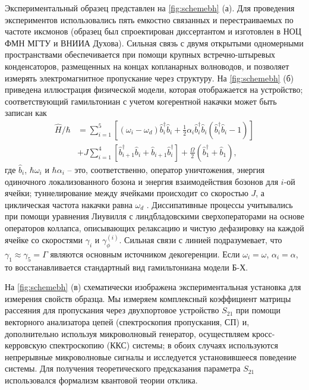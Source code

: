 \documentclass[14pt, a4paper]{extarticle}
\begin{document}
Экспериментальный образец представлен на \autoref{fig:schemebh} (а). Для проведения экспериментов использовались пять емкостно связанных и перестраиваемых по частоте иксмонов (образец был спроектирован диссертантом и изготовлен в НОЦ ФМН МГТУ и ВНИИА Духова). Сильная связь с двумя открытыми одномерными пространствами обеспечивается при помощи крупных встречно-штыревых конденсаторов, размещенных на концах копланарных волноводов, и позволяет измерять электромагнитное пропускание через структуру. На \autoref{fig:schemebh} (б) приведена иллюстрация физической модели, которая отображается на устройство; соответствующий гамильтониан с учетом когерентной накачки может быть записан как
\begin{equation}
\begin{aligned}
\hat H/\hbar &= \sum_{i=1}^5\left[ (\omega_i - \omega_d) \hat b^\dag_i \hat b_i + \frac{1}{2} \alpha_i \hat b_i^\dag \hat b_i (\hat b^\dag_i \hat b_i - 1)\right]\\
&+J\sum_{i=1}^4 \left[\hat b^\dag_{i+1} \hat b_i + \hat b_{i+1} \hat b_i^\dag\right]+\frac{\Omega}{2}(\hat b_1^\dag + \hat b_1),
\end{aligned}\label{eq:bose-hubbard}
\end{equation} 
где $\hat b_i$, $\hbar \omega_i$ и $\hbar \alpha_i$ -- это, соответственно, оператор уничтожения, энергия одиночного локализованного бозона и энергия взаимодействия бозонов  для $i$-ой ячейки; туннелирование между ячейками происходит со скоростью $J$, а циклическая частота накачки равна $\omega_d$ . Диссипативные процессы учитывались при помощи уравнения Лиувилля с линдбладовскими сверхоператорами на основе операторов коллапса, описывающих релаксацию и чистую дефазировку на каждой ячейке со скоростями $\gamma_i$ и $\gamma_{\phi}^{(i)}$. Сильная связи с линией подразумевает, что $\gamma_1 \approx \gamma_5 = \Gamma$ являются основным источником декогеренции. Если $\omega_i = \omega$, $\alpha_i = \alpha$, то восстанавливается стандартный вид гамильтониана модели Б-Х.

На \autoref{fig:schemebh} (в) схематически изображена экспериментальная установка для измерения свойств образца. Мы измеряем комплексный коэффициент матрицы рассеяния для пропускания через двухпортовое устройство $S_{21}$ при помощи векторного анализатора цепей (спектроскопия пропускания, СП) и, дополнительно используя микроволновый генератор, осуществляем кросс-керровскую спектроскопию (ККС) системы; в обоих случаях используются непрерывные микроволновые сигналы и исследуется установившееся поведение системы. Для получения теоретического предсказания параметра $S_{21}$ использовался формализм квантовой теории отклика.
	
\end{document}
